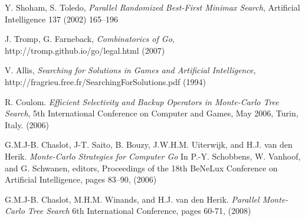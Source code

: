 \documentclass[conference]{IEEEtran}
\begin{document}
\begin{thebibliography}{1}

Y. Shoham, S. Toledo, \emph{Parallel Randomized Best-First Minimax Search},  Artificial Intelligence 137 (2002) 165--196

J. Tromp, G. Farneback, \emph{Combinatorics of Go},
http://tromp.github.io/go/legal.html (2007)

V. Allis, \emph{Searching for Solutions in Games and Artificial Intelligence},
http://fragrieu.free.fr/SearchingForSolutions.pdf (1994)

R. Coulom.  \emph{Efficient Selectivity and Backup Operators in Monte-Carlo Tree Search}, 5th International Conference on Computer and Games, May 2006, Turin, Italy. (2006)

G.M.J-B. Chaslot, J-T. Saito, B. Bouzy, J.W.H.M. Uiterwijk, and H.J. van den
Herik. \emph{Monte-Carlo Strategies for Computer Go} In P.-Y. Schobbens, W. Vanhoof,
and G. Schwanen, editors, Proceedings of the 18th BeNeLux Conference on
Artificial Intelligence, pages 83–90, (2006)

G.M.J-B. Chaslot, M.H.M. Winands, and H.J. van den Herik. \emph{Parallel Monte-Carlo Tree Search} 6th International Conference, pages 60-71, (2008)

\end{thebibliography}
\end{document}
